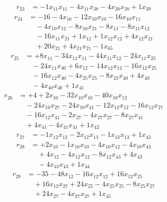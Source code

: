 \[\begin{aligned}
r_{23} &= - 1 x_{11} x_{11} - 4 x_{11} x_{38} - 4 x_{38} x_{38} + 1 x_{39}
\end{aligned}\]
\[\begin{aligned}
r_{24} &= - 16 - 4 x_{10} - 12 x_{10} x_{10} - 16 x_{10} x_{11} \\
 &\quad - 4 x_{10} x_{12} - 8 x_{10} x_{21} - 8 x_{11} - 8 x_{11} x_{12} \\
 &\quad - 16 x_{11} x_{21} + 1 x_{12} + 1 x_{12} x_{12} + 4 x_{12} x_{21} \\
 &\quad + 20 x_{21} + 4 x_{21} x_{21} - 1 x_{65}
\end{aligned}\]
\[\begin{aligned}
r_{25} &= + 8 x_{11} - 34 x_{11} x_{11} - 44 x_{11} x_{12} - 24 x_{11} x_{25} \\
 &\quad - 24 x_{11} x_{40} + 6 x_{12} - 14 x_{12} x_{12} - 16 x_{12} x_{25} \\
 &\quad - 16 x_{12} x_{40} - 4 x_{25} x_{25} - 8 x_{25} x_{40} + 4 x_{40} \\
 &\quad - 4 x_{40} x_{40} + 1 x_{41}
\end{aligned}\]
\[\begin{aligned}
r_{26} &= + 4 + 2 x_{10} - 32 x_{10} x_{10} - 40 x_{10} x_{12} \\
 &\quad - 24 x_{10} x_{27} - 24 x_{10} x_{41} - 12 x_{12} x_{12} - 16 x_{12} x_{27} \\
 &\quad - 16 x_{12} x_{41} - 2 x_{27} - 4 x_{27} x_{27} - 8 x_{27} x_{41} \\
 &\quad + 4 x_{41} - 4 x_{41} x_{41} + 1 x_{42}
\end{aligned}\]
\[\begin{aligned}
r_{27} &= - 1 x_{12} x_{12} - 2 x_{12} x_{13} - 1 x_{13} x_{13} + 1 x_{43}
\end{aligned}\]
\[\begin{aligned}
r_{28} &= + 2 x_{10} - 1 x_{10} x_{10} - 4 x_{10} x_{12} - 4 x_{10} x_{43} \\
 &\quad + 4 x_{12} - 4 x_{12} x_{12} - 8 x_{12} x_{43} + 4 x_{43} \\
 &\quad - 4 x_{43} x_{43} + 1 x_{44}
\end{aligned}\]
\[\begin{aligned}
r_{29} &= - 35 - 48 x_{12} - 16 x_{12} x_{12} + 16 x_{12} x_{25} \\
 &\quad + 16 x_{12} x_{27} + 24 x_{25} - 4 x_{25} x_{25} - 8 x_{25} x_{27} \\
 &\quad + 24 x_{27} - 4 x_{27} x_{27} + 1 x_{45}
\end{aligned}\]
